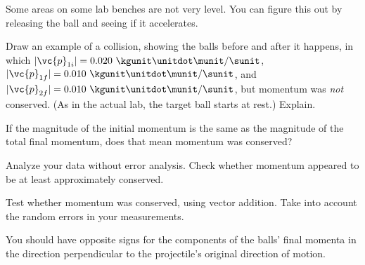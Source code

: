 Some areas on some lab benches are not very level. You can
figure this out by releasing the ball and seeing if it accelerates.

\prelab

\prelabquestion  Draw an example of a collision, showing the balls before
and after it happens, in which $|\vc{p}_{1i}|=0.020\ \kgunit\unitdot\munit/\sunit$,
$|\vc{p}_{1f}|=0.010\ \kgunit\unitdot\munit/\sunit$, and
$|\vc{p}_{2f}|=0.010\ \kgunit\unitdot\munit/\sunit$, but momentum was \emph{not}
conserved. (As in the actual lab, the target ball starts at rest.) Explain.

\prelabquestion  If the magnitude of the initial momentum is the same as
the magnitude of the total final momentum, does that mean
momentum was conserved?

\selfcheck

Analyze your data without error analysis.
Check whether
momentum appeared to be at least approximately conserved.

\analysis

Test whether momentum was conserved, using vector addition.
Take into account the random errors
in your measurements.

You should have opposite signs for the components of the
balls' final momenta in the direction perpendicular to the
projectile's original direction of motion.
